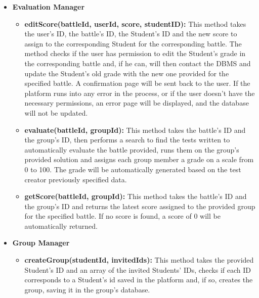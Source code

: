 \documentclass{article}
\begin{document}
{\begin{itemize}
\begin{itemize}
        the evaluated group's ID, then sends each group member a notification via e-mail, letting them know that a new score was assigned to them for their newly
        uploaded solution. This is achieved using external Notification APIs.
        \item \textbf{sendRegistrationNot(userId):} This method is called after a user's registration procedure is completed. Once the user's data is saved 
        in the user's database, an e-mail, containing a confirmation message for the registration procedure is sent to the user.
        This is achieved using external Notification APIs.  
    \end{itemize}
    \item \textbf{Evaluation Manager}
    \begin{itemize}
        \item \textbf{editScore(battleId, userId, score, studentID):} This method takes the user's ID, the battle's ID, the Student's ID and the new score to assign to the 
        corresponding Student for the corresponding battle. The method checks if the user has permission to edit the Student's grade in the corresponding battle and, 
        if he can, will then contact the DBMS and update the Student's old grade with the new one provided for the specified battle. 
        A confirmation page will be sent back to the user.
        If the platform runs into any error in the process, or if the user doesn't have the necessary permissions, an error page will be displayed, and the database will not be
        updated.
        \item \textbf{evaluate(battleId, groupId):} This method takes the battle's ID and the group's ID, then performs a search to find the tests written to automatically
        evaluate the battle provided, runs them on the group's provided solution and assigns each group member a grade on a scale from 0 to 100.
        The grade will be automatically generated based on the test creator previously specified data.
        \item \textbf{getScore(battleId, groupId):}  This method takes the battle's ID and the group's ID and returns the latest score assigned to the provided group for the 
        specified battle. If no score is found, a score of 0 will be automatically returned.
    \end{itemize}
    \item \textbf{Group Manager}
    \begin{itemize}
        \item \textbf{createGroup(studentId, invitedIds):} This method takes the provided Student's ID and an array of the invited Students' IDs,
        checks if each ID corresponds to a Student's id saved in the platform and, if so, creates the group, saving it in the group's database.  
    \end{itemize}
\end{itemize}
}
\end{document}
